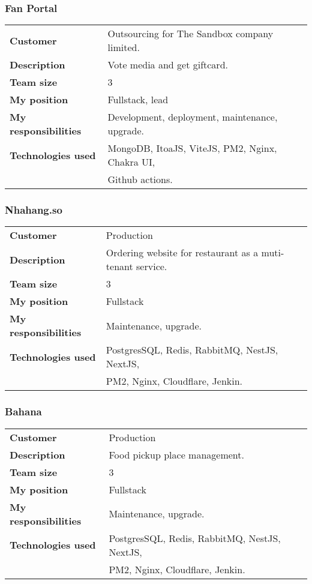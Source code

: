 \documentclass[10pt]{article} %
\begin{document}
\subsubsection*{Fan Portal}
\begin{tabular}{ll}
  \textbf{Customer} & Outsourcing for The Sandbox company limited. \\
  \textbf{Description} & Vote media and get giftcard. \\
  \textbf{Team size} & 3 \\
  \textbf{My position} & Fullstack, lead \\
  \textbf{My responsibilities} & Development, deployment, maintenance, upgrade. \\
  \textbf{Technologies used} & MongoDB, ItoaJS, ViteJS, PM2, Nginx, Chakra UI, \\
                             & Github actions. \\
\end{tabular}

\subsubsection*{Nhahang.so}
\begin{tabular}{ll}
  \textbf{Customer} & Production \\
  \textbf{Description} & Ordering website for restaurant as a muti-tenant service. \\
  \textbf{Team size} & 3 \\
  \textbf{My position} & Fullstack \\
  \textbf{My responsibilities} & Maintenance, upgrade. \\
  \textbf{Technologies used} & PostgresSQL, Redis, RabbitMQ, NestJS, NextJS, \\
                             & PM2, Nginx, Cloudflare, Jenkin. \\
\end{tabular}

\subsubsection*{Bahana}
\begin{tabular}{ll}
  \textbf{Customer} & Production \\
  \textbf{Description} & Food pickup place management. \\
  \textbf{Team size} & 3 \\
  \textbf{My position} & Fullstack \\
  \textbf{My responsibilities} & Maintenance, upgrade. \\
  \textbf{Technologies used} & PostgresSQL, Redis, RabbitMQ, NestJS, NextJS, \\
                             & PM2, Nginx, Cloudflare, Jenkin. \\
\end{tabular}
\end{document}
